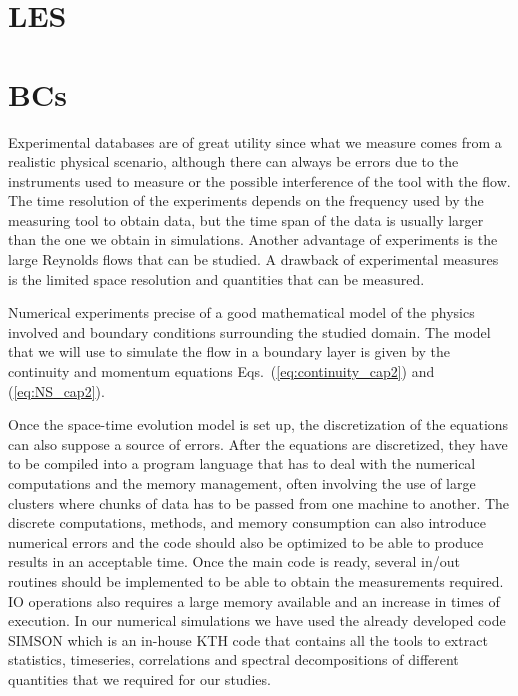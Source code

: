 





\section{LES}


\section{BCs}




Experimental databases are of great utility since what we measure comes from a realistic physical scenario, although there can always be errors due to the instruments used to measure or the possible interference of the tool with the flow.
The time resolution of the experiments depends on the frequency used by the measuring tool to obtain data, but the time span of the data is usually larger than the one we obtain in simulations.
Another advantage of experiments is the large Reynolds flows that can be studied.
A drawback of experimental measures is the limited space resolution and quantities that can be measured.

Numerical experiments precise of a good mathematical model of the physics involved and boundary conditions surrounding the studied domain. The model that we will use to simulate the flow in a boundary layer is given by the continuity and momentum equations Eqs.~(\ref{eq:continuity_cap2}) and (\ref{eq:NS_cap2}).

Once the space-time evolution model is set up, the discretization of the equations can also suppose a source of errors. After the equations are discretized, they have to be compiled into a program language that has to deal with the numerical computations and the memory management, often involving the use of large clusters where chunks of data has to be passed from one machine to another. The discrete computations, methods, and memory consumption can also introduce numerical errors and the code should also be optimized to be able to produce results in an acceptable time.
Once the main code is ready, several in/out routines should be implemented to be able to obtain the measurements required. IO operations also requires a large memory available and an increase in times of execution.
In our numerical simulations we have used the already developed code SIMSON which is an in-house KTH code that contains all the tools to extract statistics, timeseries, correlations and spectral decompositions of different quantities that we required for our studies.

